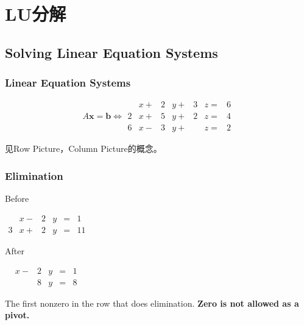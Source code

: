 \chapter{LU分解}

\section{Solving Linear Equation Systems}

\subsection{Linear Equation Systems}
\begin{example}
    $$A \boldsymbol{x}=\boldsymbol{b} \Leftrightarrow \displaystyle \begin{matrix}
              & x+ & 2 & y+ & 3 & z= & 6 \\
            2 & x+ & 5 & y+ & 2 & z= & 4 \\
            6 & x- & 3 & y+ &   & z= & 2
        \end{matrix} $$
\end{example}

见Row Picture，Column Picture的概念。

\subsection{Elimination}

\begin{example}[Elimination]
    Before

    \begin{center}
        $\displaystyle \begin{matrix}
                  & x- & 2 & y & = & 1  \\
                3 & x+ & 2 & y & = & 11
            \end{matrix}$
    \end{center}

    After
    \begin{center}
        $\displaystyle \begin{matrix}
                 & x- & 2 & y & = & 1 \\
                 &    & 8 & y & = & 8
            \end{matrix}$
    \end{center}

\end{example}

\begin{definition}[Pivot]
    The first nonzero in the row that does elimination. \textbf{Zero is not allowed as a pivot.}
\end{definition}

